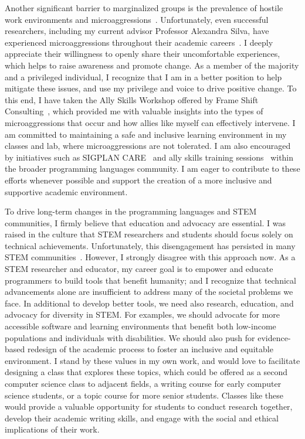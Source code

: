 \documentclass[11pt,a4paper,sans]{moderncv}
\begin{document}
Another significant barrier to marginalized groups is the prevalence of hostile work environments and microaggressions~\cite{kim_MicroaggressionsInterruptedExperience_2023,cohoon_SexismToxicWomens_2009,lee_IfYouArent_2020}. 
Unfortunately, even successful researchers, including my current advisor Professor Alexandra Silva, have experienced microaggressions throughout their academic careers~\cite{may26_PeoplePLAlexandra_2020,_AlexandraSilvaJoins_2021,zhang_MoralImplicationsBeing_2024}. 
I deeply appreciate their willingness to openly share their uncomfortable experiences, which helps to raise awareness and promote change.
As a member of the majority and a privileged individual, I recognize that I am in a better position to help mitigate these issues, and use my privilege and voice to drive positive change. 
To this end, I have taken the Ally Skills Workshop offered by Frame Shift Consulting~\cite{frameshiftconsulting_FocusAllySkills_2022}, which provided me with valuable insights into the types of microaggressions that occur and how allies like myself can effectively intervene. 
I am committed to maintaining a safe and inclusive learning environment in my classes and lab, where microaggressions are not tolerated. I am also encouraged by initiatives such as SIGPLAN CARE~\cite{_SIGPLANCARES_} and ally skills training sessions~\cite{_POPL2020Ally_} within the broader programming languages community. 
I am eager to contribute to these efforts whenever possible and support the creation of a more inclusive and supportive academic environment.

To drive long-term changes in the programming languages and STEM communities, I firmly believe that education and advocacy are essential. 
I was raised in the culture that STEM researchers and students should focus solely on technical achievements. 
Unfortunately, this disengagement has persisted in many STEM communities~\cite{cech_CultureDisengagementEngineering_2014a}. 
However, I strongly disagree with this approach now. 
As a STEM researcher and educator, my career goal is to empower and educate programmers to build tools that benefit humanity; and I recognize that technical advancements alone are insufficient to address many of the societal problems we face.
In additional to develop better tools, we need also research, education, and advocacy for diversity in STEM. 
For examples, we should advocate for more accessible software and learning environments that benefit both low-income populations and individuals with disabilities. 
We should also push for evidence-based redesign of the academic process to foster an inclusive and equitable environment. 
I stand by these values in my own work, and would love to facilitate designing a class that explores these topics, which could be offered as a second computer science class to adjacent fields, a writing course for early computer science students, or a topic course for more senior students. 
Classes like these would provide a valuable opportunity for students to conduct research together, develop their academic writing skills, and engage with the social and ethical implications of their work.
\end{document}
